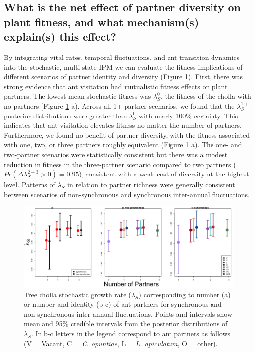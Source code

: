 \documentclass[11pt]{article}
\begin{document}
\subsection*{What is the net effect of partner diversity on plant fitness, and what mechanism(s) explain(s) this effect?}
By integrating vital rates, temporal fluctuations, and ant transition dynamics into the stochastic, multi-state IPM we can evaluate the fitness implications of different scenarios of partner identity and diversity (Figure \ref{fig:LambdaMeans}). 
First, there was strong evidence that ant visitation had mutualistic fitness effects on plant partners. 
The lowest mean stochastic fitness was $\lambda^{0}_{S}$, the fitness of the cholla with no partners (Figure \ref{fig:LambdaMeans} a).
Across all 1+ partner scenarios, we found that the $\lambda^{1+}_{S}$ posterior distributions were greater than $\lambda^{0}_{S}$ with nearly 100\% certainty.
This indicates that ant visitation elevates fitness no matter the number of partners.
Furthermore, we found no benefit of partner diversity, with the fitness associated with one, two, or three partners roughly equivalent (Figure \ref{fig:LambdaMeans} a).
The one- and two-partner scenarios were statistically consistent but there was a modest reduction in fitness in the three-partner scenario compared to two partners ($Pr(\Delta\lambda^{2-3}_{S} > 0)=0.95$), consistent with a weak cost of diversity at the highest level.
Patterns of $\lambda_{S}$ in relation to partner richness were generally consistent between scenarios of non-synchronous and synchronous inter-annual fluctuations. 

\begin{figure}
	\includegraphics[width=0.91\linewidth]{Figures/Lambdas_Comp_lines.png}
	\caption{Tree cholla stochastic growth rate ($\lambda_{S}$) corresponding to number (a) or number and identity (b-c) of ant partners for synchronous and non-synchronous inter-annual fluctuations. Points and intervals show mean and 95\% credible intervals from the posterior distributions of $\lambda_{S}$. In b-c letters in the legend correspond to ant partners as follows (V = Vacant, C = \textit{C. opuntiae}, L = \textit{L. apiculatum}, O = other).}
	\label{fig:LambdaMeans}
\end{figure}
\end{document}
